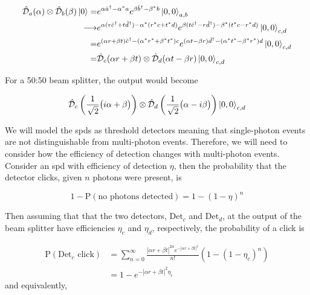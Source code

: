 \begin{align}
	\hat{\mathcal{D}}_a(\alpha)\otimes\hat{\mathcal{D}}_b(\beta)\ket{0} =&  e^{\alpha \hat{a}^\dagger - \alpha^\ast a} e^{\beta \hat{b}^\dagger - \beta^\ast b}\ket{0,0}_{a,b}\\
	\longrightarrow&  e^{\alpha (r \hat{c}^\dagger + t \hat{d}^\dagger) - \alpha^\ast (r^\ast c + t^\ast d)}e^{\beta (t \hat{c}^\dagger - r \hat{d}^\dagger) - \beta^\ast (t^\ast c - r^\ast d)}\ket{0,0}_{c,d}\\
	=&  e^{(\alpha r + \beta t) \hat{c}^\dagger - (\alpha^\ast r^\ast + \beta^\ast t^\ast) c} e^{(\alpha t - \beta r) \hat{d}^\dagger - (\alpha^\ast t^\ast - \beta^\ast r^\ast) d}\ket{0,0}_{c,d}\\
	=&  \hat{\mathcal{D}}_c(\alpha r + \beta t)\otimes\hat{\mathcal{D}}_d(\alpha t - \beta r)\ket{0,0}_{c,d}
\end{align}

For a 50:50 beam splitter, the output would become

\begin{equation}
	\hat{\mathcal{D}}_c\left(\frac{1}{\sqrt{2}}\big(i\alpha + \beta\big)\right)\otimes\hat{\mathcal{D}}_d\left(\frac{1}{\sqrt{2}}\big(\alpha - i\beta\big)\right)\ket{0,0}_{c,d}
\end{equation}

We will model the \acp{spd} as threshold detectors meaning that single-photon events are not distinguishable from multi-photon events. Therefore, we will need to consider how the efficiency of detection changes with multi-photon events. Consider an \ac{spd} with efficiency of detection $\eta$, then the probability that the detector clicks, given $n$ photons were present, is

\begin{equation}
	1 - \text{P}\left(\text{no photons detected}\right) = 1 - (1 - \eta)^n
\end{equation}

Then assuming that that the two detectors, $\text{Det}_c$ and $\text{Det}_d$, at the output of the beam splitter have efficiencies $\eta_c$ and $\eta_d$, respectively, the probability of a click is

\begin{align}
	\text{P}(\text{Det}_c \text{ click}) &= \sum_{n=0}^\infty \frac{|\alpha r + \beta t|^{2n} e^{-|\alpha r + \beta t|^2}}{n!}(1-(1-\eta_c)^n)\\
	&= 1 - e^{-|\alpha r + \beta t|^2 \eta_c}
\end{align}
and equivalently,

